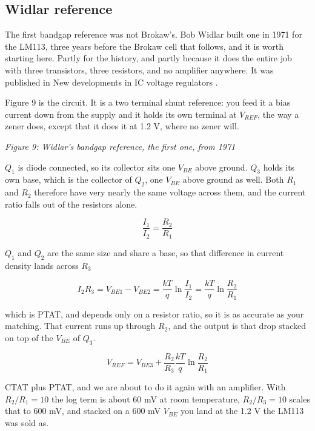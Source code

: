\subsection{Widlar reference}\label{widlar-reference}

The first bandgap reference was not Brokaw's. Bob Widlar built one in
1971 for the LM113, three years before the Brokaw cell that follows, and
it is worth starting here. Partly for the history, and partly because it
does the entire job with three transistors, three resistors, and no
amplifier anywhere. It was published in New developments in IC voltage
regulators .

Figure 9 is the circuit. It is a two terminal shunt reference: you feed
it a bias current down from the supply and it holds its own terminal at
\(V_{REF}\), the way a zener does, except that it does it at 1.2 V,
where no zener will.


{
\centering
{}
}

\emph{Figure 9: Widlar's bandgap reference, the first one, from 1971 }

\(Q_1\) is diode connected, so its collector sits one \(V_{BE}\) above
ground. \(Q_3\) holds its own base, which is the collector of \(Q_2\),
one \(V_{BE}\) above ground as well. Both \(R_1\) and \(R_2\) therefore
have very nearly the same voltage across them, and the current ratio
falls out of the resistors alone.

\[ \frac{I_1}{I_2} = \frac{R_2}{R_1} \]

\(Q_1\) and \(Q_2\) are the same size and share a base, so that
difference in current density lands across \(R_3\)

\[ I_2 R_3 = V_{BE1} - V_{BE2} = \frac{kT}{q}\ln{\frac{I_1}{I_2}} = \frac{kT}{q}\ln{\frac{R_2}{R_1}} \]

which is PTAT, and depends only on a resistor ratio, so it is as
accurate as your matching. That current runs up through \(R_2\), and the
output is that drop stacked on top of the \(V_{BE}\) of \(Q_3\).

\[ V_{REF} = V_{BE3} + \frac{R_2}{R_3}\frac{kT}{q}\ln{\frac{R_2}{R_1}} \]

CTAT plus PTAT, and we are about to do it again with an amplifier. With
\(R_2/R_1 = 10\) the log term is about 60 mV at room temperature,
\(R_2/R_3 = 10\) scales that to 600 mV, and stacked on a 600 mV
\(V_{BE}\) you land at the 1.2 V the LM113 was sold as.

